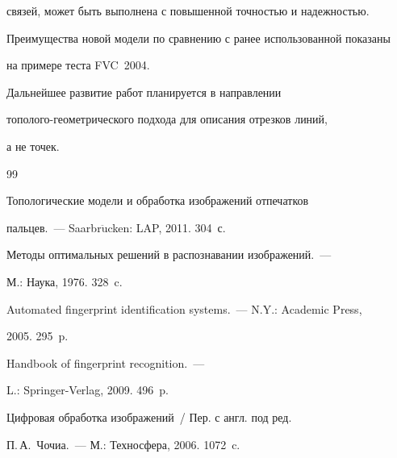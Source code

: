 связей, может быть выполнена с повышенной точностью и надежностью. 


Преимущества новой модели по сравнению с ранее использованной показаны 


на примере теста FVC~2004.


  


  Дальнейшее развитие работ планируется в направлении 


  то\-по\-ло\-го-гео\-мет\-ри\-че\-ско\-го подхода для описания отрезков линий, 


а не точек.





 {\small\frenchspacing


{%




\begin{thebibliography}{99}




 Топологические модели и обработка изображений отпечатков 


пальцев.~--- Saarbr$\ddot{\mbox{u}}$cken: LAP, 2011. 304~с.




 Методы оптимальных решений в распознавании изображений.~--- 


М.: Наука, 1976. 328~c.







 Automated fingerprint identification systems.~--- N.Y.: Academic Press, 


2005. 295~p.







 Handbook of fingerprint recognition.~--- 


L.: Springer-Verlag, 2009. 496~p.







 Цифровая обработка изображений~/ Пер. с англ. под ред. 


П.\,А.~Чочиа.~--- М.: Техносфера, 2006. 1072~c.



\end{thebibliography}}}
